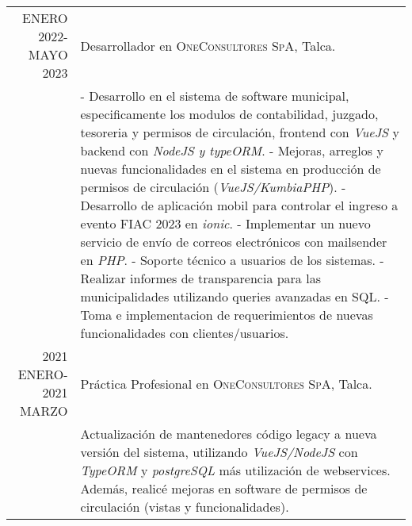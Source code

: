 \documentclass[a4paper,10pt]{article} %
\begin{document}
\begin{tabular}{r|p{11cm}}


\textsc{ENERO 2022-MAYO 2023} & Desarrollador en \textsc{OneConsultores SpA}, Talca. \emph{}\\
& \footnotesize{
    - Desarrollo en el sistema de software municipal, especificamente los modulos de contabilidad, juzgado, tesoreria y permisos de circulaci\'on, frontend con \textit{VueJS} y backend con \textit{NodeJS y typeORM}.\newline
    - Mejoras, arreglos y nuevas funcionalidades en el sistema en producci\'on de permisos de circulaci\'on (\textit{VueJS/KumbiaPHP}).\newline
    - Desarrollo de aplicaci\'on mobil para controlar el ingreso a evento FIAC 2023 en \textit{ionic}.\newline
    - Implementar un nuevo servicio de env\'io de correos electr\'onicos con mailsender en \textit{PHP}.\newline
    - Soporte t\'ecnico a usuarios de los sistemas.\newline
    - Realizar informes de transparencia para las municipalidades utilizando queries avanzadas en SQL.\newline
    - Toma e implementacion de requerimientos de nuevas funcionalidades con clientes/usuarios.\newline
}
\multicolumn{2}{c}{} \\


\textsc{2021 ENERO-2021 MARZO} & Pr\'actica Profesional en \textsc{OneConsultores SpA}, Talca. \emph{}\\
& \footnotesize{
    Actualizaci\'on de mantenedores c\'odigo legacy a nueva versi\'on del sistema, utilizando \textit{VueJS/NodeJS} con \textit{TypeORM} y \textit{postgreSQL} m\'as utilizaci\'on de webservices. Adem\'as, realic\'e mejoras en software de permisos de circulaci\'on (vistas y funcionalidades).
}
\multicolumn{2}{c}{} \\

\end{tabular}
\end{document}
